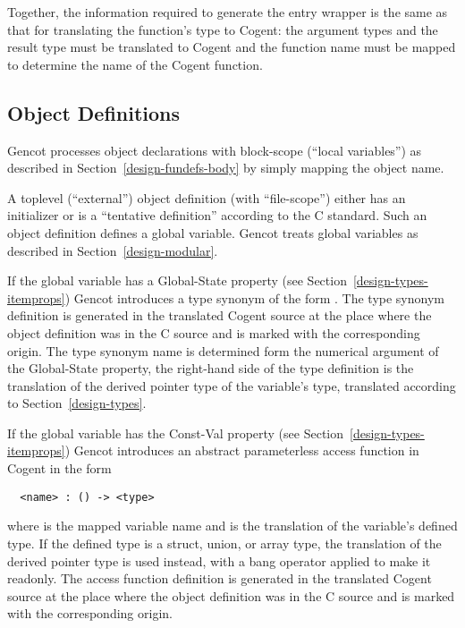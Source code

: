 Together, the information required to generate the entry wrapper is the same as that for translating the 
function's type to Cogent: the argument types and the result type must be translated to Cogent and the
function name must be mapped to determine the name of the Cogent function.

\subsection{Object Definitions}
\label{design-fundefs-object}

Gencot processes object declarations with block-scope (``local variables'') as described in Section~\ref{design-fundefs-body} 
by simply mapping the object name. 

A toplevel (``external'') object definition (with ``file-scope'') either has an initializer or is a ``tentative definition''
according to the C standard. Such an object definition defines a global variable. Gencot treats global variables
as described in Section~\ref{design-modular}.

If the global variable has a Global-State property (see Section~\ref{design-types-itemprops}) Gencot introduces a type 
synonym of the form . The type synonym definition is generated in the translated Cogent source 
at the place where the object definition was in the C source and is marked with the corresponding origin. The 
type synonym name is determined form the numerical argument of the Global-State property, the right-hand side of
the type definition is the translation of the derived pointer type of the variable's type, translated according to
Section~\ref{design-types}.

If the global variable has the Const-Val property (see Section~\ref{design-types-itemprops}) Gencot introduces an abstract 
parameterless access function in Cogent in the form
\begin{verbatim}
  <name> : () -> <type>
\end{verbatim}
where  is the mapped variable name and  is the translation of the variable's defined type.
If the defined type is a struct, union, or array type, the translation of the derived pointer type is used instead,
with a bang operator applied to make it readonly. The access function definition is generated in the translated Cogent source 
at the place where the object definition was in the C source and is marked with the corresponding origin.

